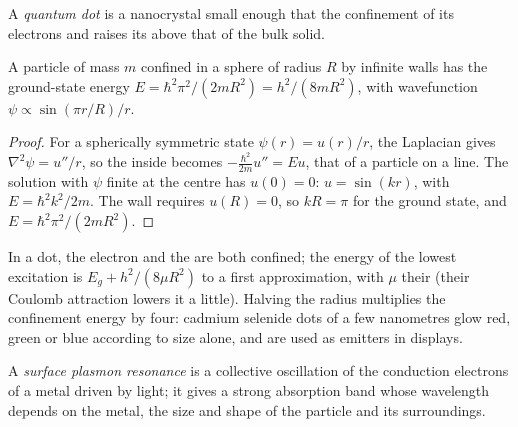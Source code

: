 \begin{definition}\label{def:b3:inorganic-materials:quantum-dot}
A \emph{quantum dot} is a  nanocrystal small
enough that the confinement of its electrons and  raises its 
above that of the bulk solid.
\end{definition}

\begin{theorem}\label{thm:b3:inorganic-materials:quantum-dot}
A particle of mass $m$ confined in a sphere of radius $R$ by infinite walls has
the ground-state energy $E = \hbar^2\pi^2/(2mR^2) = h^2/(8mR^2)$, with wavefunction $\psi \propto \sin(\pi r/R)/r$.
\end{theorem}

\begin{proof}
For a spherically symmetric state $\psi(r) = u(r)/r$, the Laplacian gives
$\nabla^2\psi = u''/r$, so the  inside becomes $-\frac{\hbar^2}{2m}u'' = Eu$, that of a particle on a
line. The solution with $\psi$ finite at the centre has $u(0) = 0$: $u = \sin(kr)$, with $E = \hbar^2k^2/2m$.
The wall requires $u(R) = 0$, so $kR = \pi$ for the ground state, and $E = \hbar^2\pi^2/(2mR^2)$.
\end{proof}

In a dot, the electron and the  are both confined; the energy of the
lowest excitation is $E_g + h^2/(8\mu R^2)$ to a first approximation, with $\mu$ their  (their Coulomb attraction lowers it a little). Halving the radius
multiplies the confinement energy by four: cadmium selenide dots of a few
nanometres glow red, green or blue according to size alone, and are used as
emitters in displays.

\begin{definition}\label{def:b3:inorganic-materials:plasmon}
A \emph{surface plasmon resonance} is a
collective oscillation of the conduction electrons of a metal 
driven by light; it gives a strong absorption band whose wavelength depends on
the metal, the size and shape of the particle and its surroundings.
\end{definition}

